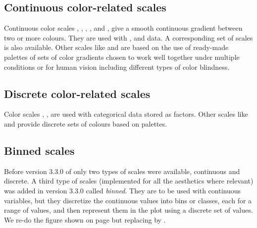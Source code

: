 \documentclass[krantz2]{krantz}\usepackage{knitr}
\begin{document}
\subsection{Continuous color-related scales}
\sloppy
Continuous color scales , , ,  ,  and , give a smooth continuous gradient between two or more colours. They are used with ,  and  data. A corresponding set of  scales is also available. Other scales like  and  are based on the use of ready-made palettes of sets of color gradients chosen to work well together under multiple conditions or for human vision including different types of color blindness.

\subsection{Discrete color-related scales}
\sloppy
Color scales , ,  are used with categorical data stored as factors. Other scales like  and  provide discrete sets of colours based on palettes.

\subsection{Binned scales}\label{sec:binned:scales}
Before version 3.3.0 of  only two types of scales were available, continuous and discrete. A third type of scales (implemented for all the aesthetics where relevant) was added in version 3.3.0 called \emph{binned}. They are to be used with continuous variables, but they discretize the continuous values into bins or classes, each for a range of values, and then represent them in the plot using a discrete set of values. We re-do the figure shown on page \pageref{chunk:plot:weighted:resid} but replacing  by .
\end{document}
